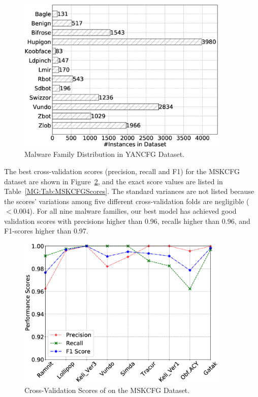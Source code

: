 \begin{figure}
    \centerline{\includegraphics[width=0.90\textwidth]{Magic/figures/YanAcfgLabelDist.eps}}
    \caption{Malware Family Distribution in YANCFG Dataset.}
    \label{MG:Fig:YANCFGLabelDist}
\end{figure}

The best cross-validation scores (precision, recall and F1) for the MSKCFG dataset are shown in Figure~\ref{MG:Fig:MSKCFGScores}, and the exact score values are listed in Table~\ref{MG:Tab:MSKCFGScores}.
The standard variances are not listed because the scores' variations among five different cross-validation folds are negligible ($<0.004$).
For all nine malware families, our best model has achieved good validation scores with precisions higher than 0.96, recalls higher than 0.96, and F1-scores higher than 0.97.

\begin{figure}
    \centerline{\includegraphics[width=0.90\textwidth]{Magic/figures/MsAcfgScores.eps}}
    \caption{Cross-Validation Scores of \sysname on the MSKCFG Dataset.}
    \label{MG:Fig:MSKCFGScores}
\end{figure}

